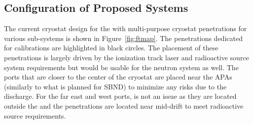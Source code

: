 

\subsection{Configuration of Proposed Systems} %
\label{sec:FTs}

The current cryostat design for the 
\spmod with multi-purpose cryostat penetrations for various sub-systems is shown in Figure~\ref{fig:ftmap}. The penetrations dedicated for calibrations are highlighted in black circles. The placement of these penetrations is largely driven by the ionization track laser and radioactive source system requirements but would be usable for the neutron system as well.  The ports that are closer to the center of the cryostat are placed near the APAs (similarly to what is planned for SBND) to minimize any risks due to the  discharge. For the far east and west ports,  is not an issue as they are located outside the  and the penetrations are located near mid-drift to meet radioactive source requirements. 

